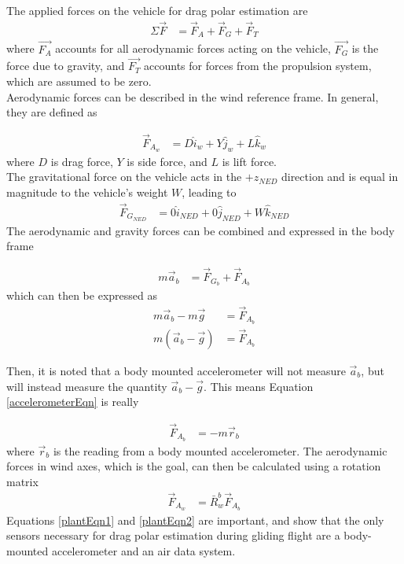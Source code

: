 The applied forces on the vehicle for drag polar estimation are 
\begin{align}
\Sigma\vec{F} &= \vec{F}_{A}+\vec{F}_{G}+\vec{F}_{T}
\end{align}
\noindent
where $\vec{F_{A}}$ accounts for all aerodynamic forces acting on the vehicle, $\vec{F_{G}}$ is the force due to gravity, and $\vec{F_{T}}$ accounts for forces from the propulsion system, which are assumed to be zero.\\
Aerodynamic forces can be described in the wind reference frame. In general, they are defined as

\begin{align}
\vec{F}_{A_w} &= D \hat{i}_w+Y \hat{j}_w+L \hat{k}_w
\end{align}
\noindent
where $D$ is drag force, $Y$ is side force, and $L$ is lift force.\\
The gravitational force on the vehicle acts in the $+z_{NED}$ direction and is equal in magnitude to the vehicle's weight $W$, leading to
\begin{align}
\vec{F}_{G_{NED}} &= 0\hat{i}_{NED}+0\hat{j}_{NED}+W\hat{k}_{NED}
\end{align}
The aerodynamic and gravity forces can be combined and expressed in the body frame

\begin{align}
m\vec{a}_b &= \vec{F}_{G_b} + \vec{F}_{A_b}
\end{align}
\noindent
which can then be expressed as 
\begin{align}
m\vec{a}_b - m\vec{g} &= \vec{F}_{A_b}\\
m(\vec{a}_b - \vec{g}) &= \vec{F}_{A_b}
\label{accelerometerEqn}
\end{align}

Then, it is noted that a body mounted accelerometer will not measure $\vec{a}_b$, but will instead measure the quantity $\vec{a}_b - \vec{g}$. This means Equation \ref{accelerometerEqn} is really

\begin{align}
\label{plantEqn1}
\vec{F}_{A_b} &= -m\vec{r}_b
\end{align}
where $\vec{r}_b$ is the reading from a body mounted accelerometer. The aerodynamic forces in wind axes, which is the goal, can then be calculated using a rotation matrix
\begin{align}
\label{plantEqn2}
\vec{F}_{A_w} &= \bar{R}^b_w\vec{F}_{A_b}
\end{align}
Equations \ref{plantEqn1} and \ref{plantEqn2} are important, and show that the only sensors necessary for drag polar estimation during gliding flight are a body-mounted accelerometer and an air data system.

